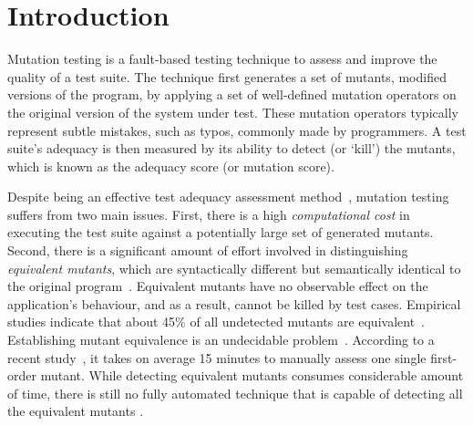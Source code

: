 \section{Introduction} \label{intro}
Mutation testing is a fault-based testing technique to assess and improve the quality of a test suite.
The technique first generates a set of mutants, \ie modified versions of the program, by applying a set of well-defined mutation operators on the original version of the system under test. 
These mutation operators typically represent subtle mistakes, such as typos, commonly made by programmers. A test suite's adequacy is then measured by its ability to detect (or `kill') the mutants, which is known as the adequacy score (or mutation score).

Despite being an effective test adequacy assessment method~\cite{andrews:icse05,jia:tse10}, mutation testing suffers from two main issues.  First, there is a high \emph{computational cost} in executing the test suite against a potentially large set of generated mutants. Second, there is a significant amount of effort  involved in distinguishing \emph{equivalent mutants}, which are syntactically different but semantically identical to the original program~\cite{budd:acta82}.  Equivalent mutants have no observable effect on the application's behaviour, and as a result, cannot be killed by test cases. Empirical studies indicate that about 45\% of all undetected mutants are equivalent~\cite{schuler:tvr12, madeyski:tse13}. 
Establishing mutant equivalence is an undecidable problem~\cite{budd:acta82}. 
According to a recent study~\cite{madeyski:tse13}, it takes on average 15 minutes to manually assess one single first-order mutant. While detecting equivalent mutants consumes considerable amount of time, there is still no fully automated technique that is capable of detecting all the equivalent mutants \cite{madeyski:tse13}. %


